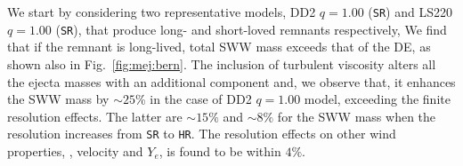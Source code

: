 %
We start by considering two representative models, 
DD2 $q=1.00$ (\texttt{SR}) and LS220 $q=1.00$ (\texttt{SR}), that produce 
long- and short-loved remnants respectively, 
We find that if the remnant is long-lived, total \ac{SWW} mass exceeds that of 
the \ac{DE}, as shown also in Fig.~\ref{fig:mej:bern}.
%
%
%
The inclusion of turbulent viscosity alters all the ejecta masses with an
additional component \citep{Radice:2018ghv} and, we observe that, it enhances the 
\ac{SWW} mass by ${\sim}25$\% in the case of DD2 $q=1.00$ model,
exceeding the finite resolution effects. 
%
The latter are ${\sim}15\%$ and ${\sim}8\%$ for the \ac{SWW} mass when the 
resolution increases from \texttt{SR} to \texttt{HR}.
The resolution effects on other wind properties, \eg, velocity and $Y_e$, 
is found to be within $4\%$.
%

